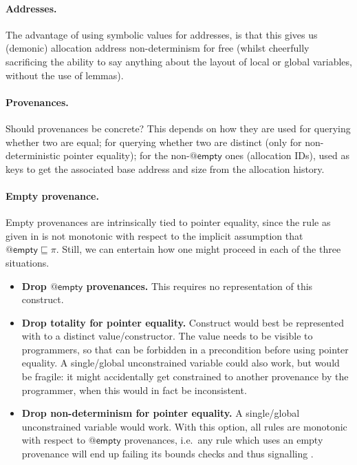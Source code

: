 \paragraph{Addresses.}%
The advantage of using symbolic values for addresses, is that this gives us
(demonic) allocation address non-determinism for free (whilst cheerfully
sacrificing the ability to say anything about the layout of local or global
variables, without the use of lemmas).

\paragraph{Provenances.}%
Should provenances be concrete? This depends on how they are used \textemdash{}
for querying whether two are equal; for querying whether two are distinct (only
for non-deterministic pointer equality); for the non-$@\mathsf{empty}$ ones
(allocation IDs), used as keys to get the associated base address and size from
the allocation history.

\paragraph{Empty provenance.}%
Empty provenances are intrinsically tied to pointer equality, since the rule
as given in  is not monotonic with respect to the implicit assumption
that $@\mathsf{empty} \sqsubseteq \pi$. Still, we can entertain how one might
proceed in each of the three situations.
\begin{itemize}
    \item \textbf{Drop $@\mathsf{empty}$ provenances.} This requires
        no representation of this construct.
    \item \textbf{Drop totality for pointer equality.}
        Construct would best be represented with to a distinct
        value/constructor. The value needs to be visible to programmers,
        so that can be forbidden in a precondition before using pointer
        equality. A single/global unconstrained variable could also work, but
        would be fragile: it might accidentally get constrained to another
        provenance by the programmer, when this would in fact be inconsistent.
    \item \textbf{Drop non-determinism for pointer equality.}
        A single/global unconstrained variable would work. With this option,
        all rules are monotonic with respect to $@\mathsf{empty}$ provenances,
        i.e.\ any rule which uses an empty provenance will end up failing its
        bounds checks and thus signalling .
\end{itemize}


